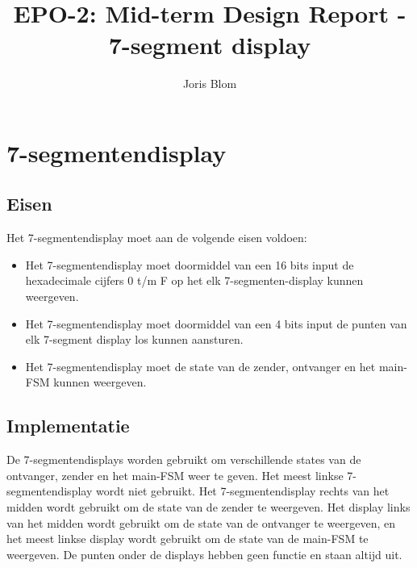 \documentclass{report}
\title{EPO-2: Mid-term Design Report - 7-segment display}
\author{Joris Blom}
\begin{document}
\chapter{7-segmentendisplay}
\label{ch:sseg}
\section{Eisen}
\label{sec:Eisen}
Het 7-segmentendisplay moet aan de volgende eisen voldoen: 
\begin{itemize}
\item Het 7-segmentendisplay moet doormiddel van een 16 bits input de hexadecimale cijfers 0 t/m F op het elk 7-segmenten-display kunnen weergeven.
\item Het 7-segmentendisplay moet doormiddel van een 4 bits input de punten van elk 7-segment display los kunnen aansturen.
\item Het 7-segmentendisplay moet de state van de zender, ontvanger en het main-FSM kunnen weergeven.
\end{itemize}

\section{Implementatie}
De 7-segmentendisplays worden gebruikt om verschillende states van de ontvanger, zender en het main-FSM weer te geven.
Het meest linkse 7-segmentendisplay wordt niet gebruikt.
Het 7-segmentendisplay rechts van het midden wordt gebruikt om de state van de zender te weergeven.
Het display links van het midden wordt gebruikt om de state van de ontvanger te weergeven, en het meest linkse display wordt gebruikt om de state van de main-FSM te weergeven.
De punten onder de displays hebben geen functie en staan altijd uit.
\newpage
\end{document}
